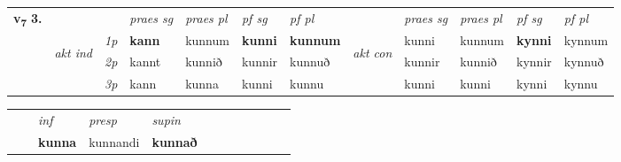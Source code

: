 \begin{tabular}{llllllllllll} \toprule
\multirow{4}{*}{{{\textbf{v{\textsubscript{7}}} \Large{\textbf{3.}}}}}  & &   &  \textit{praes sg}  & \textit{praes pl}  &\textit{ pf sg} & \textit{pf pl} &  &  \textit{praes sg}  & \textit{praes pl}  & \textit{pf sg} & \textit{pf pl } \\*
	\cmidrule{4-7} \cmidrule{9-12}
 & \multirow{3}{*}{\begin{turn}{90}\textit{akt ind}\end{turn}} & {\textit{1p}} & \textbf{kann} & kunnum    & \textbf{kunni} & \textbf{kunnum} & \multirow{3}{*}{\begin{turn}{90}\textit{akt con}\end{turn}} &kunni & kunnum & \textbf{kynni} & kynnum\\*
& &  {\textit{2p}} &  kannt  & kunnið   & kunnir & kunnuð & & kunnir & kunnið & kynnir & kynnuð \\*
& &  {\textit{3p}} & kann & kunna   & kunni & kunnu & & kunni & kunni& kynni & kynnu  \\*
\cmidrule{4-7} \cmidrule{9-12}
\end{tabular}


\begin{tabular}{llllllllllll}
 & & \textit{inf}     & \textit{presp} & \textit{supin}       \\*
  & & \textbf{kunna}      & kunnandi &  \textbf{kunnað}   \\*
\cmidrule{1-12}
\end{tabular}



